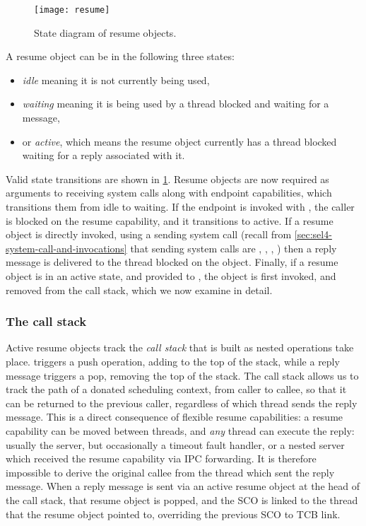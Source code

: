 \begin{figure}[t]
    \centering
    \texttt{[image: resume]}
    \caption{State diagram of resume objects.}
    \label{f:resume-state-diagram}
\end{figure}

A resume object can be in the following three states:
\begin{itemize}
    \item \emph{idle} meaning it is not currently being used,
    \item \emph{waiting} meaning it is being used by a thread blocked and waiting for a message, 
    \item or \emph{active}, which means the resume object currently has a thread blocked waiting for a reply associated with it.
\end{itemize}
Valid state transitions are shown in \cref{f:resume-state-diagram}. Resume objects are now required
as arguments  to
receiving system calls along with endpoint capabilities, which transitions them from idle to
waiting.
If the endpoint is invoked with \call, the caller is blocked on the resume capability, and
it transitions to active.  
If a resume object is directly invoked, using a sending system call (recall from
\cref{sec:sel4-system-call-and-invocations} that sending system calls are \send,
\nbsend, \call, \reply) then a reply message is delivered to the thread blocked on
the object. Finally, if a resume object is in an active state, and provided to \recv, the object
is first invoked, and removed from the call stack, which we now examine in detail. 


\subsubsection{The call stack}

Active resume objects track the \emph{call stack} that is built as nested \call operations take
place. \call triggers a push operation, adding to the top of the stack, while a reply message
triggers a
pop, removing the top of the stack.  The call stack allows us to track the path of a donated
scheduling context, from caller to callee, so that it can be returned to the previous caller,
regardless of which thread sends the reply message. This is a direct consequence of flexible resume
capabilities:  a resume capability can be moved between threads, and \emph{any} thread can execute the
reply: usually the server, but occasionally a timeout fault handler, or a nested server which
received the resume capability via \gls{IPC} forwarding. It is therefore impossible to derive the
original callee from the thread which sent the reply message. When a reply message is sent via an 
active resume object at the head of the call stack, that resume object is popped, and the \gls{SCO} is
linked to the thread that the resume object pointed to, overriding the previous \gls{SCO} to
\gls{TCB} link.

